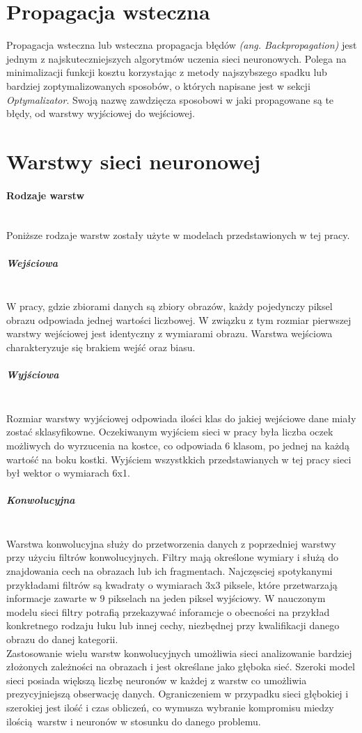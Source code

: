 \section{Propagacja wsteczna}

Propagacja wsteczna lub wsteczna propagacja błędów \textit{(ang. Backpropagation)}
jest jednym z najskuteczniejszych algorytmów uczenia sieci neuronowych. Polega
na minimalizacji funkcji kosztu korzystając z metody najszybszego spadku lub
bardziej zoptymalizowanych sposobów, o których napisane jest w sekcji \textit{Optymalizator}.
Swoją nazwę zawdzięcza sposobowi w jaki propagowane są te błędy, od warstwy
wyjściowej do wejściowej.

\section{Warstwy sieci neuronowej}

\paragraph{Rodzaje warstw} \mbox{}\\
Poniższe rodzaje warstw zostały użyte w modelach przedstawionych w tej pracy.

\subparagraph{Wejściowa}  \mbox{}\\
W pracy, gdzie zbiorami danych są zbiory obrazów, każdy pojedynczy piksel obrazu
odpowiada jednej wartości liczbowej. W związku z tym rozmiar pierwszej warstwy
wejściowej jest identyczny z wymiarami obrazu. Warstwa wejściowa charakteryzuje się
brakiem wejść oraz biasu.

\subparagraph{Wyjściowa}  \mbox{}\\
Rozmiar warstwy wyjściowej odpowiada ilości klas do jakiej wejściowe dane miały
zostać sklasyfikowne. Oczekiwanym wyjściem sieci w pracy była liczba oczek możliwych
do wyrzucenia na kostce, co odpowiada 6 klasom, po jednej na każdą wartość na boku
kostki. Wyjściem wszystkkich przedstawianych w tej pracy sieci był wektor o wymiarach
6x1.

\subparagraph{Konwolucyjna}  \mbox{}\\
Warstwa konwolucyjna służy do przetworzenia danych z poprzedniej warstwy przy użyciu
filtrów konwolucyjnych. Filtry mają określone wymiary i służą do znajdowania cech
na obrazach lub ich fragmentach. Najczęsciej spotykanymi przykładami filtrów są
kwadraty o wymiarach 3x3 piksele, które przetwarzają informacje zawarte w 9 pikselach
na jeden piksel wyjściowy. W nauczonym modelu sieci filtry potrafią przekazywać inforamcje
o obecności na przykład konkretnego rodzaju łuku lub innej cechy, niezbędnej przy
kwalifikacji danego obrazu do danej kategorii. \\
Zastosowanie wielu warstw konwolucyjnych umożliwia sieci analizowanie bardziej złożonych
zależności na obrazach i jest określane jako głęboka sieć. Szeroki model sieci posiada
większą liczbę neuronów w każdej z warstw co umożliwia prezycyjniejszą obserwację danych.
Ograniczeniem w przypadku sieci głębokiej i szerokiej jest ilość i czas obliczeń, co
wymusza wybranie kompromisu miedzy ilością warstw i neuronów w stosunku do danego problemu.

